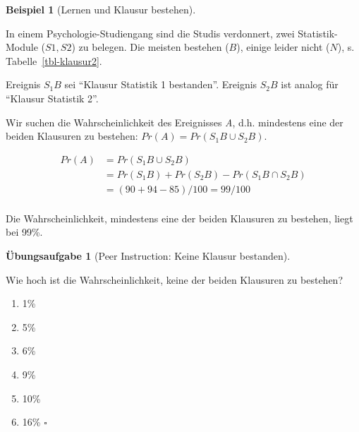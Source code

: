 \documentclass[
  ngerman,
  letterpaper,
  twoside,
  open=any]{scrbook}
\providecommand{\tightlist}{%
  \setlength{\itemsep}{0pt}\setlength{\parskip}{0pt}}\usepackage{longtable,booktabs,array}
\theoremstyle{definition}
\newtheorem{example}{Beispiel}[chapter]
\theoremstyle{plain}
\theoremstyle{definition}
\newtheorem{exercise}{Übungsaufgabe}[chapter]
\theoremstyle{definition}
\theoremstyle{remark}
\begin{document}
\begin{example}[Lernen und Klausur
bestehen]\protect\hypertarget{exm-klausur-bed-wskt}{}\label{exm-klausur-bed-wskt}

In einem Psychologie-Studiengang sind die Studis verdonnert, zwei
Statistik-Module (\(S1, S2\)) zu belegen. Die meisten bestehen (\(B\)),
einige leider nicht (\(N\)), s. Tabelle~\ref{tbl-klausur2}.

Ereignis \(S_1B\) sei \enquote{Klausur Statistik 1 bestanden}. Ereignis
\(S_2B\) ist analog für \enquote{Klausur Statistik 2}.

Wir suchen die Wahrscheinlichkeit des Ereignisses \emph{A}, d.h.
mindestens eine der beiden Klausuren zu bestehen:
\(Pr(A) = Pr(S_1B \cup S_2B)\).

\begin{table}

\caption{\label{tbl-klausur2}Daten von 100 Studis; L: Lerner, B:
Bestanden, N: Negation/Nicht}


\end{table}%

\begin{align}
Pr(A) &= Pr(S_1B \cup S_2B) \\
&= Pr(S_1B) + Pr(S_2B) - Pr(S_1B \cap S_2B)  \\
&= (90 + 94 - 85) / 100 = 99 / 100\\
\end{align}

Die Wahrscheinlichkeit, mindestens eine der beiden Klausuren zu
bestehen, liegt bei 99\%.

\begin{exercise}[Peer Instruction: Keine Klausur
bestanden]\protect\hypertarget{exr-keine-klausur-bestanden}{}\label{exr-keine-klausur-bestanden}

Wie hoch ist die Wahrscheinlichkeit, keine der beiden Klausuren zu
bestehen?

\begin{enumerate}
\def\labelenumi{\Alph{enumi})}
\tightlist
\item
  1\%
\item
  5\%
\item
  6\%
\item
  9\%
\item
  10\%
\item
  16\% \(\square\)
\end{enumerate}

\end{exercise}

\end{example}
\end{document}
